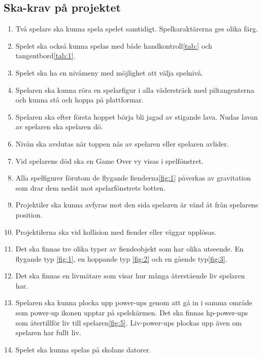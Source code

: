 \documentclass{TDP005mall}
\begin{document}
\subsection{Ska-krav på projektet}
\begin{enumerate}
\item Två spelare ska kunna spela spelet samtidigt. Spelkaraktärerna ges olika färg.
\item Spelet ska också kunna spelas med både handkontroll\ref{tab:} och tangentbord\ref{tab:1}. 
\item Spelet ska ha en nivåmeny med möjlighet att välja spelnivå.
\item Spelaren ska kunna röra en spelarfigur i alla vädersträck med piltangenterna och kunna stå och hoppa på plattformar.
\item Spelaren ska efter första hoppet börja bli jagad av stigande lava. Nudas lavan av spelaren ska spelaren dö.
\item Nivån ska avslutas när toppen nås av spelaren eller spelaren avlider.
\item Vid spelarens död ska en Game Over vy visas i spelfönstret.
\item Alla spelfigurer förutom de flygande fienderna\ref{fig:1} påverkas av gravitation som drar dem nedåt mot spelarfönstrets botten.
\item Projektiler ska kunna avfyras mot den sida spelaren är vänd åt från spelarens position.
\item Projektilerna ska vid kollision med fiender eller väggar upplösas.
\item Det ska finnas tre olika typer av fiendeobjekt som har olika utseende. En flygande typ \ref{fig:1}, en hoppande typ \ref{fig:2} och en gående typ\ref{fig:3}.
\item Det ska finnas en livmätare som visar hur många återstående liv spelaren har.
\item Spelaren ska kunna plocka upp power-ups genom att gå in i samma område som power-up ikonen upptar på spelskärmen. Det ska finnas hp-power-ups som återtillför liv till spelaren\ref{fig:5}. Liv-power-ups plockas upp även om spelaren har fullt liv.
\item Spelet ska kunna spelas på skolans datorer.
\end{enumerate}
\end{document}
